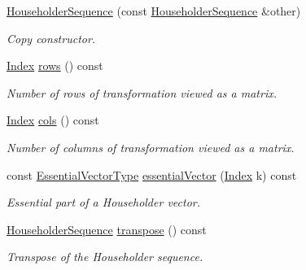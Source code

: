 \begin{DoxyCompactItemize}
\mbox{\label{group___householder___module_aa4b1b93fff4d5c79342974d9d2a9eec8}} 
\hyperlink{group___householder___module_aa4b1b93fff4d5c79342974d9d2a9eec8}{Householder\+Sequence} (const \hyperlink{group___householder___module_class_eigen_1_1_householder_sequence}{Householder\+Sequence} \&other)
\begin{DoxyCompactList}\small\item\em Copy constructor. \end{DoxyCompactList}\item 
\hyperlink{group___core___module_a554f30542cc2316add4b1ea0a492ff02}{Index} \hyperlink{group___householder___module_a6eaafe2460930d1f4aa67d6e577b71f0}{rows} () const
\begin{DoxyCompactList}\small\item\em Number of rows of transformation viewed as a matrix. \end{DoxyCompactList}\item 
\hyperlink{group___core___module_a554f30542cc2316add4b1ea0a492ff02}{Index} \hyperlink{group___householder___module_adcdcdd92a77810ce4bdd2b1282fe6a75}{cols} () const
\begin{DoxyCompactList}\small\item\em Number of columns of transformation viewed as a matrix. \end{DoxyCompactList}\item 
const \hyperlink{group___core___module_class_eigen_1_1_block}{Essential\+Vector\+Type} \hyperlink{group___householder___module_ac91cf37b0cbea9e504c89e021fd289ba}{essential\+Vector} (\hyperlink{group___core___module_a554f30542cc2316add4b1ea0a492ff02}{Index} k) const
\begin{DoxyCompactList}\small\item\em Essential part of a Householder vector. \end{DoxyCompactList}\item 
\mbox{\label{group___householder___module_aa60b1f1ed1a699d092c865d1a0da47e9}} 
\hyperlink{group___householder___module_class_eigen_1_1_householder_sequence}{Householder\+Sequence} \hyperlink{group___householder___module_aa60b1f1ed1a699d092c865d1a0da47e9}{transpose} () const
\begin{DoxyCompactList}\small\item\em Transpose of the Householder sequence. \end{DoxyCompactList}\item 

\end{DoxyCompactItemize}
